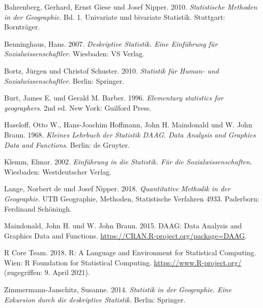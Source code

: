 \documentclass[
  11pt,
  ngerman,
  a4paper,
]{report}
\newlength{\cslhangindent}
\newenvironment{CSLReferences}[2] %
 {%
  \setlength{\parindent}{0pt}
  \ifodd #1 \everypar{\setlength{\hangindent}{\cslhangindent}}\ignorespaces\fi
  \ifnum #2 > 0
  \setlength{\parskip}{#2\baselineskip}
  \fi
 }%
 {}
\begin{document}
\hypertarget{refs}{}
\begin{CSLReferences}{1}{0}
\leavevmode{}%
Bahrenberg, Gerhard, Ernst Giese und Josef Nipper. 2010. \emph{Statistische Methoden in der Geographie}. Bd. 1. Univariate und bivariate Statistik. Stuttgart: Bornträger.

\leavevmode{}%
Benninghaus, Hans. 2007. \emph{Deskriptive Statistik. Eine Einführung für Sozialwissenschaftler}. Wiesbaden: VS Verlag.

\leavevmode{}%
Bortz, Jürgen und Christof Schuster. 2010. \emph{Statistik für Human- und Sozialwissenschaftler}. Berlin: Springer.

\leavevmode{}%
Burt, James E. und Gerald M. Barber. 1996. \emph{Elementary statistics for geographers}. 2nd ed. New York: Guilford Press.

\leavevmode{}%
Haseloff, Otto W., Hans-Joachim Hoffmann, John H. Maindonald und W. John Braun. 1968. \emph{Kleines Lehrbuch der Statistik DAAG. Data Analysis and Graphics Data and Functions}. Berlin: de Gruyter.

\leavevmode{}%
Klemm, Elmar. 2002. \emph{Einführung in die Statistik. Für die Sozialwissenschaften}. Wiesbaden: Westdeutscher Verlag.

\leavevmode{}%
Lange, Norbert de und Josef Nipper. 2018. \emph{Quantitative Methodik in der Geographie}. {UTB} Geographie, Methoden, Statistische Verfahren 4933. Paderborn: Ferdinand Schöningh.

\leavevmode{}%
Maindonald, John H. und W. John Braun. 2015. DAAG: Data Analysis and Graphics Data and Functions. \url{https://CRAN.R-project.org/package=DAAG}.

\leavevmode{}%
R Core Team. 2018. R: A Language and Environment for Statistical Computing. Wien: R Foundation for Statistical Computing. \url{https://www.R-project.org/} (zugegriffen: 9. April 2021).

\leavevmode{}%
Zimmermann-Janschitz, Susanne. 2014. \emph{Statistik in der Geographie. Eine Exkursion durch die deskriptive Statistik}. Berlin: Springer.

\end{CSLReferences}
\end{document}
